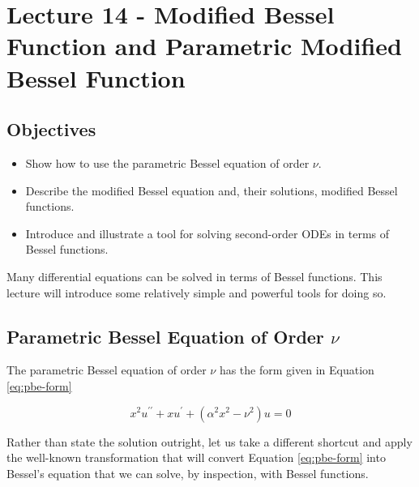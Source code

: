 \chapter{Lecture 14 - Modified Bessel Function and Parametric Modified Bessel Function}
\label{ch:lec14}
\section{Objectives}
\begin{itemize}
\item Show how to use the parametric Bessel equation of order $\nu$.
\item Describe the modified Bessel equation and, their solutions, modified Bessel functions.
\item Introduce and illustrate a tool for solving second-order ODEs in terms of Bessel functions.
\end{itemize}

Many differential equations can be solved in terms of Bessel functions.  This lecture will introduce some relatively simple and powerful tools for doing so.

\section{Parametric Bessel Equation of Order $\nu$}
The parametric Bessel equation of order $\nu$ has the form given in Equation \ref{eq:pbe-form}

\begin{equation}
x^{2}u^{\prime \prime} + xu^{\prime} + \left(\alpha^2 x^2 - \nu^2 \right)u= 0
\label{eq:pbe-form}
\end{equation}

Rather than state the solution outright, let us take a different shortcut and apply the well-known transformation that will convert Equation \ref{eq:pbe-form} into Bessel's equation that we can solve, by inspection, with Bessel functions.

